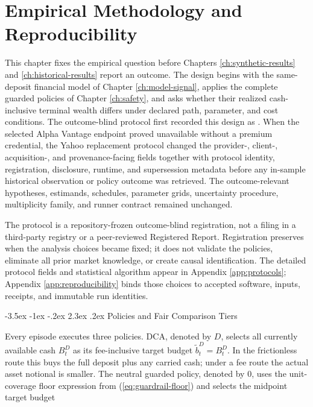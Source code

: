 \documentclass[12pt,a4paper,oneside]{report}
\makeatletter
\renewcommand\section{\@startsection{section}{1}{\z@}%
  {-3.5ex \@plus -1ex \@minus -.2ex}%
  {2.3ex \@plus .2ex}%
  {\normalfont\fontsize{14}{17}\selectfont\bfseries}}
\makeatother
\begin{document}
\chapter{Empirical Methodology and Reproducibility}
\label{ch:methodology}

This chapter fixes the empirical question before Chapters
\ref{ch:synthetic-results} and \ref{ch:historical-results} report an outcome.
The design begins with the same-deposit financial model of Chapter
\ref{ch:model-signal}, applies the complete guarded policies of Chapter
\ref{ch:safety}, and asks whether their realized cash-inclusive terminal wealth
differs under declared path, parameter, and cost conditions. The outcome-blind
protocol first recorded this design as
. When the selected
Alpha Vantage endpoint proved unavailable without a premium credential, the
Yahoo replacement protocol
 changed the
provider-, client-, acquisition-, and provenance-facing fields together with
protocol identity, registration, disclosure, runtime, and supersession
metadata before any in-sample historical observation or policy outcome was
retrieved. The outcome-relevant hypotheses, estimands, schedules, parameter
grids, uncertainty procedure, multiplicity family, and runner contract
remained unchanged.

The protocol is a repository-frozen outcome-blind registration, not a filing
in a third-party registry or a peer-reviewed Registered Report. Registration
preserves when the analysis choices became fixed; it does not validate the
policies, eliminate all prior market knowledge, or create causal
identification. The detailed protocol fields and statistical algorithm appear
in Appendix \ref{app:protocols}; Appendix \ref{app:reproducibility} binds those
choices to accepted software, inputs, receipts, and immutable run identities.

\section{Policies and Fair Comparison Tiers}
\label{sec:method-policy-comparisons}

Every episode executes three policies. DCA, denoted by $D$, selects all
currently available cash $B_t^D$ as its fee-inclusive target budget
$\widetilde b_t^D=B_t^D$. In the frictionless route this buys the full deposit
plus any carried cash; under a fee route the actual asset notional is smaller.
The neutral guarded policy, denoted by $0$, uses the unit-coverage floor
expression from (\ref{eq:guardrail-floor}) and selects the midpoint target
budget
\end{document}
